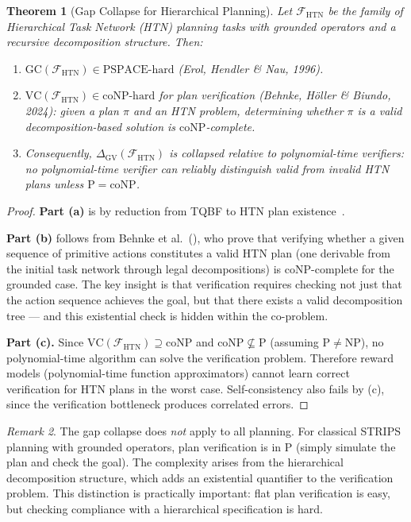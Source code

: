 \documentclass{article}
\newtheorem{theorem}{Theorem}
\theoremstyle{definition}
\theoremstyle{remark}
\newtheorem{remark}[theorem]{Remark}
\newcommand{\PTIME}{\mathrm{P}}
\newcommand{\NP}{\mathrm{NP}}
\newcommand{\coNP}{\mathrm{coNP}}
\newcommand{\PSPACE}{\mathrm{PSPACE}}
\newcommand{\VC}{\mathrm{VC}}           %
\newcommand{\GC}{\mathrm{GC}}           %
\newcommand{\GVGap}{\Delta_{\mathrm{GV}}} %
\newcommand{\calF}{\mathcal{F}}         %
\begin{document}
\begin{theorem}[Gap Collapse for Hierarchical Planning]
\label{thm:collapse}
Let $\calF_{\text{HTN}}$ be the family of Hierarchical Task Network (HTN) planning tasks with grounded operators and a recursive decomposition structure.
Then:
\begin{enumerate}[label=(\alph*)]
    \item $\GC(\calF_{\text{HTN}}) \in \PSPACE\text{-hard}$ (Erol, Hendler \& Nau, 1996).
    \item $\VC(\calF_{\text{HTN}}) \in \coNP\text{-hard}$ for plan verification (Behnke, Höller \& Biundo, 2024): given a plan $\pi$ and an HTN problem, determining whether $\pi$ is a valid decomposition-based solution is $\coNP$-complete.
    \item Consequently, $\GVGap(\calF_{\text{HTN}})$ is collapsed relative to polynomial-time verifiers: no polynomial-time verifier can reliably distinguish valid from invalid HTN plans unless $\PTIME = \coNP$.
\end{enumerate}
\end{theorem}

\begin{proof}
\textbf{Part (a)} is by reduction from TQBF to HTN plan existence~\citep{erol1996complexity}.

\textbf{Part (b)} follows from Behnke et al.~(\citeyear{behnke2024verification}), who prove that verifying whether a given sequence of primitive actions constitutes a valid HTN plan (one derivable from the initial task network through legal decompositions) is $\coNP$-complete for the grounded case.
The key insight is that verification requires checking not just that the action sequence achieves the goal, but that there exists a valid decomposition tree --- and this existential check is hidden within the co-problem.

\textbf{Part (c).}
Since $\VC(\calF_{\text{HTN}}) \supseteq \coNP$ and $\coNP \not\subseteq \PTIME$ (assuming $\PTIME \neq \NP$), no polynomial-time algorithm can solve the verification problem.
Therefore reward models (polynomial-time function approximators) cannot learn correct verification for HTN plans in the worst case.
Self-consistency also fails by (c), since the verification bottleneck produces correlated errors.
\end{proof}

\begin{remark}
The gap collapse does \emph{not} apply to all planning.
For classical STRIPS planning with grounded operators, plan verification is in $\PTIME$ (simply simulate the plan and check the goal).
The complexity arises from the hierarchical decomposition structure, which adds an existential quantifier to the verification problem.
This distinction is practically important: flat plan verification is easy, but checking compliance with a hierarchical specification is hard.
\end{remark}
\end{document}
